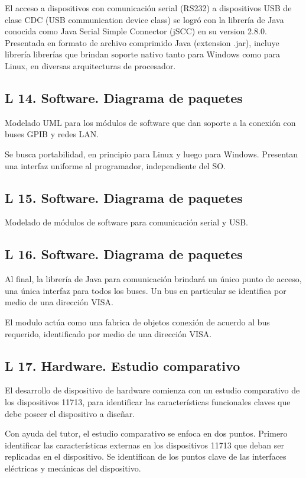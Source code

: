 \documentclass[paper=letter,oneside,fontsize=9pt]{scrartcl}
\begin{document}
	El acceso a dispositivos con comunicación serial (RS232) a dispositivos USB de clase CDC (USB communication device class) se logró con la librería de Java conocida como Java Serial Simple Connector (jSCC) en su version 2.8.0. Presentada en formato de archivo comprimido Java (extension .jar), incluye librería  librerías que brindan soporte nativo tanto para Windows como para Linux, en diversas arquitecturas de procesador.
	
	\subsection{L 14. Software. Diagrama de paquetes} 
	
	Modelado UML para los módulos de software que dan soporte a la conexión con buses GPIB y redes LAN. 
	
	Se busca portabilidad, en principio para Linux y luego para Windows. Presentan una interfaz uniforme al programador, independiente del SO.
	
	\subsection{L 15. Software. Diagrama de paquetes} 

	Modelado de módulos de software para comunicación serial y USB. 
	
	\subsection{L 16. Software. Diagrama de paquetes} 
	
	Al final, la librería de Java para comunicación brindará un único punto de acceso, una única interfaz para todos los buses. Un bus en particular se identifica por medio de una dirección VISA.
	
	El modulo actúa como una fabrica de objetos conexión de acuerdo al bus requerido, identificado por medio de una dirección VISA.	
	
	\subsection{L 17. Hardware. Estudio comparativo} 

	El desarrollo de dispositivo de hardware comienza con un estudio comparativo de los dispositivos 11713, para identificar las características funcionales claves que debe poseer el dispositivo a diseñar.
	
	Con ayuda del tutor, el estudio comparativo se enfoca en dos puntos. Primero identificar las características externas en los dispositivos 11713 que deban ser replicadas en el dispositivo. Se identifican de los puntos clave de las interfaces eléctricas y mecánicas del dispositivo.	
	
\end{document}
